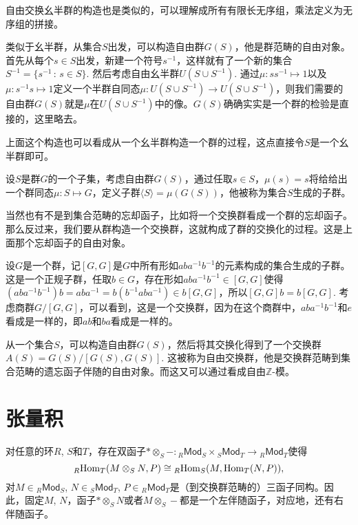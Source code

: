 自由交换幺半群的构造也是类似的，可以理解成所有有限长无序组，乘法定义为无序组的拼接。

\begin{para}
类似于幺半群，从集合$S$出发，可以构造自由群$G(S)$，他是群范畴的自由对象。首先从每个$s\in S$出发，新建一个符号$s^{-1}$，这样就有了一个新的集合$S^{-1}=\{s^{-1}\,:\, s\in S\}$. 然后考虑自由幺半群$U(S\cup S^{-1})$. 通过$\mu: ss^{-1}\mapsto 1$以及$\mu: s^{-1}s\mapsto 1$定义一个半群自同态$\mu:U(S\cup S^{-1})\to U(S\cup S^{-1})$，则我们需要的自由群$G(S)$就是$\mu$在$U(S\cup S^{-1})$中的像。$G(S)$确确实实是一个群的检验是直接的，这里略去。
\end{para}

上面这个构造也可以看成从一个幺半群构造一个群的过程，这点直接令$S$是一个幺半群即可。

\para 设$S$是群$G$的一个子集，考虑自由群$G(S)$，通过任取$s\in S$，$\mu(s)=s$将给给出一个群同态$\mu:S\mapsto G$，定义子群$\langle S\rangle=\mu(G(S))$，他被称为集合$S$生成的子群。

\begin{para}
当然也有不是到集合范畴的忘却函子，比如将一个交换群看成一个群的忘却函子。那么反过来，我们要从群构造一个交换群，这就构成了群的交换化的过程。这是上面那个忘却函子的自由对象。

设$G$是一个群，记$[G,G]$是$G$中所有形如$aba^{-1}b^{-1}$的元素构成的集合生成的子群。这是一个正规子群，任取$b\in G$，存在形如$aba^{-1}b^{-1}\in [G,G]$使得$(aba^{-1}b^{-1})b=aba^{-1}=b(b^{-1}aba^{-1})\in b[G,G]$，所以$[G,G]b=b[G,G]$. 考虑商群$G/[G,G]$，可以看到，这是一个交换群，因为在这个商群中，$aba^{-1}b^{-1}$和$e$看成是一样的，即$ab$和$ba$看成是一样的。

从一个集合$S$，可以构造自由群$G(S)$，然后将其交换化得到了一个交换群$A(S)=G(S)/[G(S),G(S)]$. 这被称为自由交换群，他是交换群范畴到集合范畴的遗忘函子伴随的自由对象。而这又可以通过看成自由$\mathbb{Z}$-模。
\end{para}

\section{张量积}

\begin{thm}\label{thmten}
对任意的环$R$, $S$和$T$，存在双函子$*\otimes_S -:{}_R\mathsf{Mod}_S\times {}_S\mathsf{Mod}_T\to {}_R\mathsf{Mod}_T$使得
\[
	{}_R\!\operatorname{Hom}_{T}(M\otimes_S N,P)\cong {}_R\!\operatorname{Hom}_S(M,\operatorname{Hom}_{T}(N,P)),
\]
对$M\in {}_R\mathsf{Mod}_S$, $N\in {}_S\mathsf{Mod}_T$, $P\in {}_R\mathsf{Mod}_T$是（到交换群范畴的）三函子同构。因此，固定$M$, $N$，函子$*\otimes_S N$或者$M\otimes_S -$都是一个左伴随函子，对应地，还有右伴随函子。
\end{thm}

